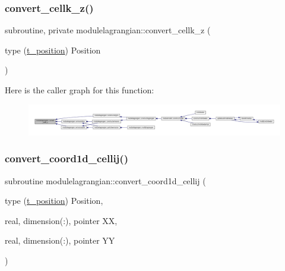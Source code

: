 \subsubsection{\texorpdfstring{convert\+\_\+cellk\+\_\+z()}{convert\_cellk\_z()}}
{\footnotesize\ttfamily subroutine, private modulelagrangian\+::convert\+\_\+cellk\+\_\+z (\begin{DoxyParamCaption}\item[{type (\mbox{\hyperlink{structmodulelagrangian_1_1t__position}{t\+\_\+position}})}]{Position }\end{DoxyParamCaption})\hspace{0.3cm}{\ttfamily [private]}}

Here is the caller graph for this function\+:\nopagebreak
\begin{figure}[H]
\begin{center}
\leavevmode
\includegraphics[width=350pt]{namespacemodulelagrangian_a57a623f0deb9516670279b9b6aad02a1_icgraph}
\end{center}
\end{figure}
\mbox{\label{namespacemodulelagrangian_a7675e0420886642ca2fa921c21fdaca5}} 
\subsubsection{\texorpdfstring{convert\+\_\+coord1d\+\_\+cellij()}{convert\_coord1d\_cellij()}}
{\footnotesize\ttfamily subroutine modulelagrangian\+::convert\+\_\+coord1d\+\_\+cellij (\begin{DoxyParamCaption}\item[{type (\mbox{\hyperlink{structmodulelagrangian_1_1t__position}{t\+\_\+position}})}]{Position,  }\item[{real, dimension(\+:), pointer}]{XX,  }\item[{real, dimension(\+:), pointer}]{YY }\end{DoxyParamCaption})\hspace{0.3cm}{\ttfamily [private]}}

